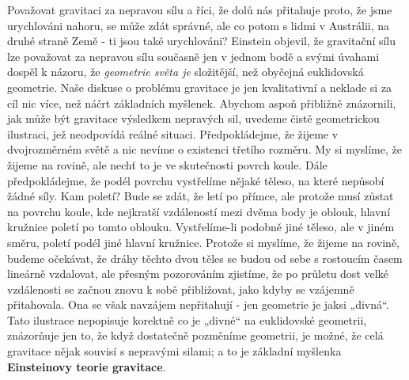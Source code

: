     Považovat gravitaci za nepravou sílu a říci, že dolů nás přitahuje proto, že jsme urychlováni 
    nahoru, se může zdát správné, ale co potom s lidmi v Austrálii, na druhé straně Země - ti jsou 
    také urychlováni? Einstein objevil, že gravitační sílu lze považovat za nepravou sílu současně 
    jen v jednom bodě a svými úvahami dospěl k názoru, že \emph{geometrie světa je} složitější, 
    než obyčejná euklidovská geometrie. Naše diskuse o problému gravitace je jen kvalitativní a 
    neklade si za cíl nic více, než náčrt základních myšlenek. Abychom aspoň přibližně znázornili, 
    jak může být gravitace výsledkem nepravých sil, uvedeme čistě geometrickou ilustraci, jež 
    neodpovídá reálné situaci. Předpokládejme, že žijeme v dvojrozměrném světě a nic nevíme o 
    existenci třetího rozměru. My si myslíme, že žijeme na rovině, ale nechť to je ve skutečnosti 
    povrch koule. Dále předpokládejme, že podél povrchu vystřelíme nějaké těleso, na které nepůsobí 
    žádné síly. Kam poletí? Bude se zdát, že letí po přímce, ale protože musí zůstat na povrchu 
    koule, kde nejkratší vzdáleností mezi dvěma body je oblouk, hlavní kružnice poletí po tomto 
    oblouku. Vystřelíme-li podobně jiné těleso, ale v jiném směru, poletí podél jiné hlavní 
    kružnice. Protože si myslíme, že žijeme na rovině, budeme očekávat, že dráhy těchto dvou těles 
    se budou od sebe s rostoucím časem lineárně vzdalovat, ale přesným pozorováním zjistíme, že po 
    průletu dost velké vzdálenosti se začnou znovu k sobě přibližovat, jako kdyby se vzájemně 
    přitahovala. Ona se však navzájem nepřitahují - jen geometrie je jaksi „divná“. Tato ilustrace 
    nepopisuje korektně co je „divné“ na euklidovské geometrii, znázorňuje jen to, že když 
    dostatečně pozměníme geometrii, je možné, že celá gravitace nějak souvisí s nepravými silami; a 
    to je základní myšlenka \textbf{Einsteinovy teorie gravitace}.
    
